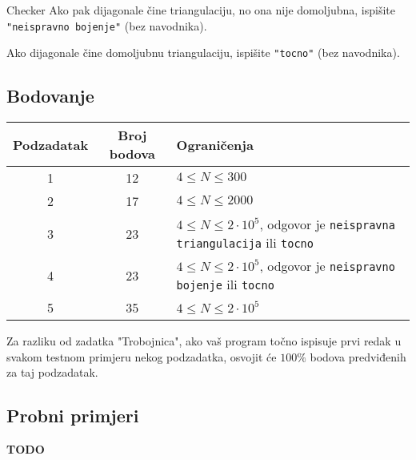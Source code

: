 \begin{statement}[
  problempoints=110,
  timelimit=1 sekund1,
  memorylimit=512 MiB,
]{Checker}
Ako pak dijagonale čine triangulaciju, no ona nije domoljubna, ispišite
\texttt{"neispravno bojenje"} (bez navodnika).

Ako dijagonale čine domoljubnu triangulaciju, ispišite \texttt{"tocno"}
(bez navodnika).

\subsection*{Bodovanje}
{\renewcommand{\arraystretch}{1.4}
  \setlength{\tabcolsep}{6pt}
  \begin{tabular}{ccl}
 Podzadatak & Broj bodova & Ograničenja \\ \midrule
  1 & 12 & $4 \le N \le 300$ \\
  2 & 17 & $4 \le N \le 2000$ \\
    3 & 23 & $4 \le N \le 2\cdot10^5$, odgovor je \texttt{neispravna triangulacija} ili \texttt{tocno} \\
    4 & 23 & $4 \le N \le 2\cdot10^5$, odgovor je \texttt{neispravno bojenje} ili \texttt{tocno} \\
  5 & 35 & $4 \le N \le 2\cdot10^5$
\end{tabular}}

Za razliku od zadatka "Trobojnica", ako vaš program točno ispisuje prvi redak u
svakom testnom primjeru nekog podzadatka, osvojit će $100\%$ bodova predviđenih
za taj podzadatak.

\subsection*{Probni primjeri}

\textbf{TODO}

\end{statement}

